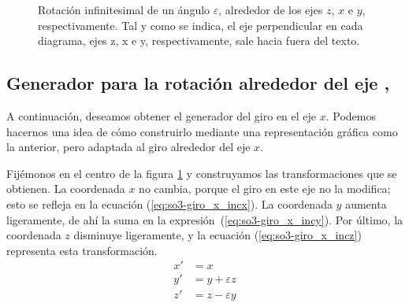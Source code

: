 \begin{figure}[ht]
\begin{minipage}{0.31\linewidth}
  \end{minipage}
  \caption{Rotación infinitesimal de un ángulo $\varepsilon$,
    alrededor de los ejes $z$, $x$ e $y$, respectivamente.
    Tal y como se indica, el eje perpendicular en cada diagrama, ejes z, x e y,
    respectivamente, sale hacia fuera del texto.}
  \label{fig:so3-giros_zxy}
\end{figure}

\subsection{Generador para la rotación alrededor del eje
   , } 
 A continuación, deseamos obtener el generador del giro en el eje $x$.
 Podemos hacernos una idea de cómo construirlo mediante una representación gráfica como la anterior, pero adaptada al giro alrededor del eje $x$.

 Fijémonos en el centro de la figura \ref{fig:so3-giros_zxy} y construyamos las transformaciones que se obtienen.
 La coordenada $x$ no cambia, porque el giro en este eje no la modifica; esto se refleja en la ecuación (\ref{eq:so3-giro_x_incx}).
 La coordenada $y$ aumenta ligeramente, de ahí la suma en la expresión~(\ref{eq:so3-giro_x_incy}).
 Por último, la coordenada $z$ disminuye ligeramente, y la ecuación (\ref{eq:so3-giro_x_incz}) representa
esta transformación.
\begin{subequations}\label{eq:so3-giro_x_incxyz}
\begin{align}
  \label{eq:so3-giro_x_incx}
  x' &= x \\
  \label{eq:so3-giro_x_incy}
  y' &= y + \varepsilon z\\
  \label{eq:so3-giro_x_incz}
  z' &= z - \varepsilon y
\end{align}
\end{subequations}

